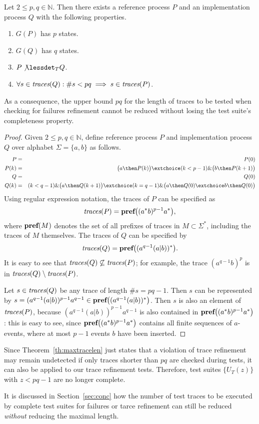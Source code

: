 \begin{theorem}\label{th:maxtracelen}
Let $2\le p,q \in\mathbb{N}$. Then there exists a reference process $P$ and an
implementation process $Q$ with the following properties.
\begin{enumerate}
\item $G(P)$ has $p$ states.
\item $G(Q)$ has $q$ states.
\item $P\not\lessdet_T Q$.
\item $\forall s\in\text{\it traces}(Q): \#s < pq\implies s\in\text{\it traces}(P)$.
\end{enumerate}
As a consequence, the upper bound $pq$ for the length of traces to be tested when checking for failures refinement cannot be reduced without losing the test suite's completeness property.
\end{theorem}
\begin{proof}
Given $2\le p,q \in\mathbb{N}$, define reference process $P$ and implementation process $Q$
over alphabet $\Sigma =\{ a,b\}$ as follows.
\begin{eqnarray*}
P & = &  P(0) 
\\
P(k) & = & \big( a \then P(k) \big) \extchoice (k < p-1) \& \big( b \then P(k+1)\big)
\\ 
Q & = & Q(0)
\\
Q(k) & = & (k < q-1) \& \big( a \then Q(k+1)    \big) \extchoice 
( k = q-1)\& \big( a\then Q(0) \extchoice b\then Q(0)  \big)
\end{eqnarray*}
Using regular expression notation, the traces of $P$ can be specified as
\[
\text{\it traces}(P) = \text{\bf pref}\big(  (a^*b)^{p-1}a^* \big),
\]
where $\text{\bf pref}(M)$ denotes the set of all prefixes of traces in $M\subset\Sigma^*$, 
including the traces of $M$ themselves.
The traces of $Q$ can be specified by
\[
\text{\it traces}(Q) = \text{\bf pref}\big( (a^{q-1}(a|b))^*  \big).
\]
It is easy to see that $\text{\it traces}(Q)\not\subseteq\text{\it traces}(P)$; 
for example, the trace $(a^{q-1}b)^p$ is in
$\text{\it traces}(Q)\setminus\text{\it traces}(P)$.

Let $s \in\text{\it traces}(Q)$ be any trace of length $\#s = pq-1$. Then $s$ can be represented 
by $s = (a^{q-1}(a|b))^{p-1}a^{q-1} \in \text{\bf pref}\big( (a^{q-1}(a|b))^*  \big)$. 
Then $s$ is also an element of $\text{\it traces}(P)$, because $(a^{q-1}(a|b))^{p-1}a^{q-1}$ 
is also contained in $\text{\bf pref}\big(  (a^*b)^{p-1}a^* \big)$: this is easy to see, since
$\text{\bf pref}\big(  (a^*b)^{p-1}a^* \big)$ contains all finite sequences of $a$-events, 
where at most $p-1$ events $b$ have been inserted.
\xbox
\end{proof}

Since Theorem~\ref{th:maxtracelen} just states that a violation of trace refinement
may remain undetected if only traces shorter than $pq$ are checked during tests, 
it can also be applied to our trace refinement tests. Therefore, 
test suites $\{ U_T(z) \}$ with $z<pq-1$ are no longer complete.


It is discussed in Section~\ref{sec:conc} how the number of test traces to be executed 
by complete test suites for failures or tarce 
refinement   can still be reduced {\it without} reducing 
the maximal length.

